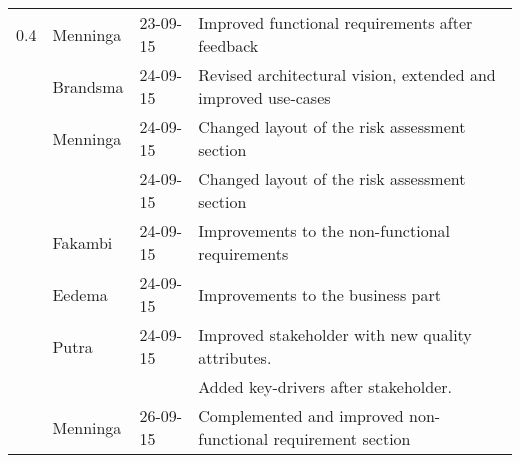 \begin{longtable}{L{} L{} L{} L{}}
	0.4              & Menninga              & 23-09-15      & Improved functional requirements after feedback                                                                                                                                                                            \\
	                 & Brandsma              & 24-09-15      & Revised architectural vision, extended and improved use-cases                                                                                                                                                              \\
	                 & Menninga              & 24-09-15      & Changed layout of the risk assessment section                                                                                                                                                                              \\
	                 &                       & 24-09-15      & Changed layout of the risk assessment section                                                                                                                                                                              \\
	                 & Fakambi               & 24-09-15      & Improvements to the non-functional requirements                                                                                                                                                                            \\
	                 & Eedema                & 24-09-15      & Improvements to the business part                                                                                                                                                                                          \\
	                 & Putra                 & 24-09-15      & Improved stakeholder with new quality attributes.                                                                                                                                                                          \\
	                 &                       &               & Added key-drivers after stakeholder.                                                                                                                                                                                       \\
	                 & Menninga              & 26-09-15      & Complemented and improved non-functional requirement section                                                                                                                                                               \\

\end{longtable}
